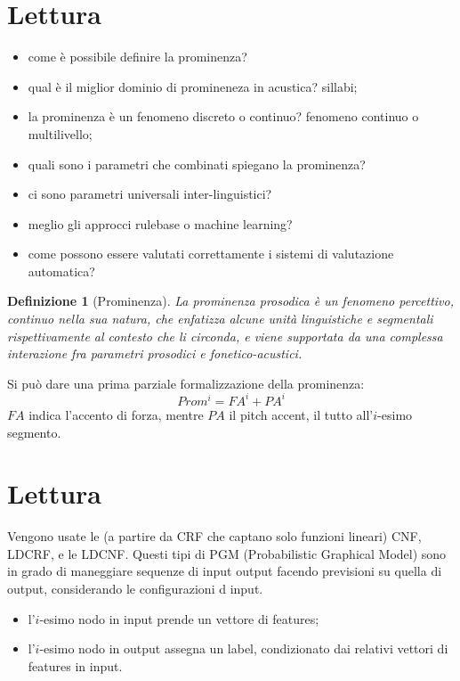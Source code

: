 \documentclass[twoside,twocolumn]{article}
\theoremstyle{definition}
\begin{document}
\section{Lettura \cite{bib:prominence-by-acoustic-analyses}}
	\begin{itemize}
		\item come è possibile definire la prominenza?
		\item qual è il miglior dominio di promineneza in acustica? sillabi;
		\item la prominenza è un fenomeno discreto o continuo? fenomeno continuo o multilivello;
		\item quali sono i parametri che combinati spiegano la prominenza? 
		\item ci sono parametri universali inter-linguistici?
		\item meglio gli approcci rulebase o machine learning?
		\item come possono essere valutati correttamente i sistemi di valutazione automatica?
	\end{itemize}
	\theoremstyle{plain}
	\newtheorem{definition}{Definizione}
	\begin{definition}[Prominenza]\label{def:prosodic-prominency}
		La prominenza prosodica è un fenomeno percettivo, continuo nella sua natura, che enfatizza alcune unità linguistiche e segmentali rispettivamente al contesto che li circonda, e viene supportata da una complessa interazione fra parametri prosodici e fonetico-acustici.
	\end{definition}

	Si può dare una prima parziale formalizzazione della prominenza:
	\begin{equation}
		\label{eq:prom}
		Prom^i = FA^i + PA^i
	\end{equation}
	$FA$ indica l'accento di forza, mentre $PA$ il pitch accent, il tutto all'$i$-esimo segmento.

\section{Lettura \cite{bib:prominence-detection-italian}}
	Vengono usate le (a partire da CRF che captano solo funzioni lineari) CNF, LDCRF, e le LDCNF. Questi tipi di PGM (Probabilistic Graphical Model) sono in grado di maneggiare sequenze di input output facendo previsioni su quella di output, considerando le configurazioni d input.
	\begin{itemize}
		\item l'$i$-esimo nodo in input prende un vettore di features;
		\item l'$i$-esimo nodo in output assegna un label, condizionato dai relativi vettori di features in input.
	\end{itemize}
\end{document}
